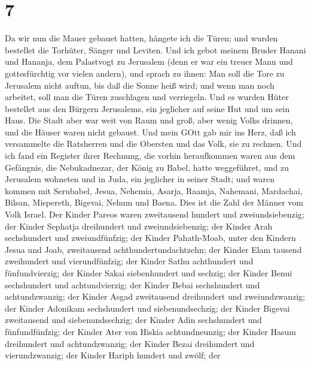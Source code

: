 \hypertarget{section-6}{%
\section{7}\label{section-6}}

 Da wir nun die Mauer gebauet hatten, hängete ich die Türen;
und wurden bestellet die Torhüter, Sänger und Leviten.  Und
ich gebot meinem Bruder Hanani und Hananja, dem Palastvogt zu Jerusalem
(denn er war ein treuer Mann und gottesfürchtig vor vielen andern),
 und sprach zu ihnen: Man soll die Tore zu Jerusalem nicht
auftun, bis daß die Sonne heiß wird; und wenn man noch arbeitet, soll
man die Türen zuschlagen und verriegeln. Und es wurden Hüter bestellet
aus den Bürgern Jerusalems, ein jeglicher auf seine Hut und um sein
Haus.  Die Stadt aber war weit von Raum und groß, aber wenig
Volks drinnen, und die Häuser waren nicht gebauet.  Und mein
GOtt gab mir ins Herz, daß ich versammelte die Ratsherren und die
Obersten und das Volk, sie zu rechnen. Und ich fand ein Register ihrer
Rechnung,  die vorhin heraufkommen waren aus dem Gefängnis,
die Nebukadnezar, der König zu Babel, hatte weggeführet, und zu
Jerusalem wohneten und in Juda, ein jeglicher in seiner Stadt;
 und waren kommen mit Serubabel, Jesua, Nehemia, Asarja,
Raamja, Nahemani, Mardachai, Bilsan, Mispereth, Bigevai, Nehum und
Baena. Dies ist die Zahl der Männer vom Volk Israel.  Der
Kinder Pareos waren zweitausend hundert und zweiundsiebenzig;
 der Kinder Sephatja dreihundert und zweiundsiebenzig;
 der Kinder Arah sechshundert und zweiundfünfzig;
 der Kinder Pahath-Moab, unter den Kindern Jesua und Joab,
zweitausend achthundertundachtzehn;  der Kinder Elam
tausend zweihundert und vierundfünfzig;  der Kinder Sathu
achthundert und fünfundvierzig;  der Kinder Sakai
siebenhundert und sechzig;  der Kinder Benui sechshundert
und achtundvierzig;  der Kinder Bebai sechshundert und
achtundzwanzig;  der Kinder Asgad zweitausend dreihundert
und zweiundzwanzig;  der Kinder Adonikam sechshundert und
siebenundsechzig;  der Kinder Bigevai zweitausend und
siebenundsechzig;  der Kinder Adin sechshundert und
fünfundfünfzig;  der Kinder Ater von Hiskia achtundneunzig;
 der Kinder Hasum dreihundert und achtundzwanzig;
 der Kinder Bezai dreihundert und vierundzwanzig;
 der Kinder Hariph hundert und zwölf;  der
